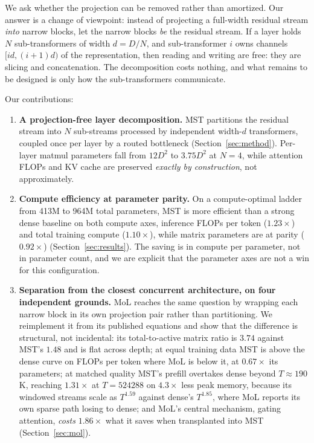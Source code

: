 \documentclass{article}
\newcommand{\dmodel}{D}
\newcommand{\dsub}{d}
\newcommand{\nsub}{N}
\begin{document}
We ask whether the projection can be removed rather than amortized. Our answer is
a change of viewpoint: instead of projecting a full-width residual stream
\emph{into} narrow blocks, let the narrow blocks \emph{be} the residual stream.
If a layer holds $\nsub$ sub-transformers of width $\dsub = \dmodel/\nsub$, and
sub-transformer $i$ owns channels $[i\dsub, (i{+}1)\dsub)$ of the representation,
then reading and writing are free: they are slicing and concatenation. The
decomposition costs nothing, and what remains to be designed is only how the
sub-transformers communicate.

Our contributions:

\begin{enumerate}
\item \textbf{A projection-free layer decomposition.} MST partitions the residual
stream into $\nsub$ sub-streams processed by independent width-$\dsub$
transformers, coupled once per layer by a routed bottleneck
(Section~\ref{sec:method}). Per-layer matmul parameters fall from $12\dmodel^2$ to
$3.75\dmodel^2$ at $\nsub{=}4$, while attention FLOPs and KV cache are preserved
\emph{exactly by construction}, not approximately.

\item \textbf{Compute efficiency at parameter parity.} On a compute-optimal
ladder from 413M to 964M total parameters, MST is more efficient than a strong
dense baseline on both compute axes, inference FLOPs per token ($1.23\times$) and
total training compute ($1.10\times$), while matrix parameters are at parity
($0.92\times$) (Section~\ref{sec:results}). The saving is in compute per
parameter, not in parameter count, and we are explicit that the parameter axes are
not a win for this configuration.

\item \textbf{Separation from the closest concurrent architecture, on four
independent grounds.} MoL \citep{ternovtsii2026mol} reaches the same question by
wrapping each narrow block in its own projection pair rather than partitioning.
We reimplement it from its published equations and show that the difference is
structural, not incidental: its total-to-active matrix ratio is $3.74$ against
MST's $1.48$ and is flat across depth; at equal training data MST is above the
dense curve on FLOPs per token where MoL is below it, at $0.67\times$ its
parameters; at matched quality MST's prefill overtakes dense beyond
$T{\approx}190$K, reaching $1.31\times$ at $T{=}524288$ on $4.3\times$ less peak
memory, because its windowed streams scale as $T^{1.59}$ against dense's
$T^{1.85}$, where MoL reports its own sparse path losing to dense; and MoL's central mechanism, gating
attention, \emph{costs} $1.86\times$ what it saves when transplanted into MST
(Section~\ref{sec:mol}).


\end{enumerate}
\end{document}
